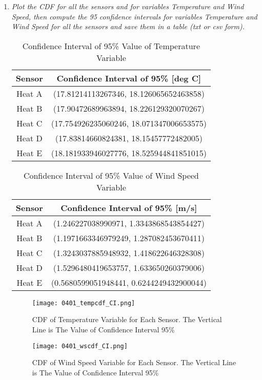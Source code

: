 \documentclass[a4paper,12pt]{article} %
\begin{document}
\begin{enumerate}

\item {\it Plot the CDF for all the sensors and for variables Temperature and Wind Speed, then compute the 95 confidence intervals for variables Temperature and Wind Speed for all the sensors and save them in a table (txt or csv form).} %

\begin{table} [H]
\centering
\begin{tabular}{|c|c|}
\hline
Sensor & Confidence Interval of 95\% [deg C]              \\ \hline
Heat A & (17.81214113267346, 18.126065652463858)  \\ \hline
Heat B & (17.90472689963894, 18.226129320070267)  \\ \hline
Heat C & (17.754926235060246, 18.071347006653575) \\ \hline
Heat D & (17.83814660824381, 18.15457772482005)   \\ \hline
Heat E & (18.181933946027776, 18.525944841851015) \\ \hline
\end{tabular}
\caption{\label{tab:table-name} Confidence Interval of 95\% Value of Temperature Variable}
\end{table}

\begin{table} [H]
\centering
\begin{tabular}{|c|c|}
\hline
Sensor & \multicolumn{1}{c|}{Confidence Interval of 95\% [m/s]} \\ \hline
Heat A & (1.246227038990971, 1.3343868543854427)          \\ \hline
Heat B & (1.1971663346979249, 1.287082453670411)          \\ \hline
Heat C & (1.3243037885948932, 1.418622646328308)          \\ \hline
Heat D & (1.5296480419653757, 1.633650260379006)          \\ \hline
Heat E & (0.5680599051948441, 0.6244249432900044)         \\ \hline
\end{tabular}
\caption{\label{tab:table-name} Confidence Interval of 95\% Value of Wind Speed Variable}
\end{table}
\setlength{\belowcaptionskip}{-15pt}
\begin{figure}[H]
    \centering
    \texttt{[image: 0401\_tempcdf\_CI.png]}
    \caption{CDF of Temperature Variable for Each Sensor. The Vertical Line is The Value of Confidence Interval 95\%}
    \label{fig:my_label}
\end{figure}
\setlength{\belowcaptionskip}{-15pt}
\begin{figure}[H]
    \centering
    \texttt{[image: 0401\_wscdf\_CI.png]}
    \caption{CDF of Wind Speed Variable for Each Sensor. The Vertical Line is The Value of Confidence Interval 95\%}
    \label{fig:my_label}
\end{figure}


\end{enumerate}
\end{document}
